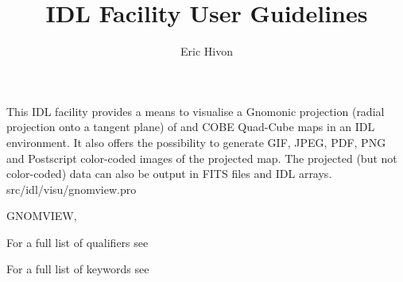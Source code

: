 




\sloppy



\title{\healpix IDL Facility User Guidelines}
 \section[gnomview]{ }
\label{idl:\thedocid}
\author{Eric Hivon}



\begin{facility}
{This IDL facility provides a means to visualise a Gnomonic projection 
(radial projection onto a tangent plane) of
\healpix and COBE Quad-Cube maps in an IDL environment. 
It also offers the possibility to
generate GIF, JPEG, PDF, PNG and Postscript color-coded images of the projected map.
The projected (but not color-coded) data can also be output in FITS files and
IDL arrays.}
{src/idl/visu/gnomview.pro}
\end{facility}

\begin{IDLformat}
{GNOMVIEW, 
\normalsize{
}
}
\end{IDLformat}


\begin{qualifiers}
  \begin{qulist}{} %
\item [{\  }] For a full list of qualifiers see 
  \end{qulist}
\end{qualifiers}

\begin{keywords}
  \begin{kwlist}{} %
\item [{\  }] For a full list of keywords see 
  \end{kwlist}
\end{keywords}

